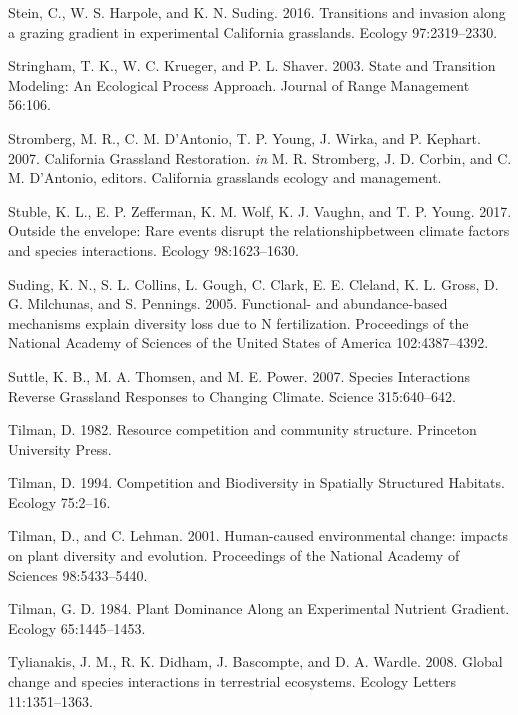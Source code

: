 \documentclass[twoside,12pt,final]{ucthesis-CA2012}
\begin{document}
\begin{ucmainmatter}
\leavevmode\hypertarget{ref-Stein2016}{}%
Stein, C., W. S. Harpole, and K. N. Suding. 2016. Transitions and invasion along a grazing gradient in experimental California grasslands. Ecology 97:2319--2330.

\leavevmode\hypertarget{ref-Stringham2003}{}%
Stringham, T. K., W. C. Krueger, and P. L. Shaver. 2003. State and Transition Modeling: An Ecological Process Approach. Journal of Range Management 56:106.

\leavevmode\hypertarget{ref-Stromberg2007}{}%
Stromberg, M. R., C. M. D'Antonio, T. P. Young, J. Wirka, and P. Kephart. 2007. California Grassland Restoration. \emph{in} M. R. Stromberg, J. D. Corbin, and C. M. D'Antonio, editors. California grasslands ecology and management.

\leavevmode\hypertarget{ref-Stuble2017}{}%
Stuble, K. L., E. P. Zefferman, K. M. Wolf, K. J. Vaughn, and T. P. Young. 2017. Outside the envelope: Rare events disrupt the relationshipbetween climate factors and species interactions. Ecology 98:1623--1630.

\leavevmode\hypertarget{ref-Suding2005}{}%
Suding, K. N., S. L. Collins, L. Gough, C. Clark, E. E. Cleland, K. L. Gross, D. G. Milchunas, and S. Pennings. 2005. Functional- and abundance-based mechanisms explain diversity loss due to N fertilization. Proceedings of the National Academy of Sciences of the United States of America 102:4387--4392.

\leavevmode\hypertarget{ref-Suttle2007}{}%
Suttle, K. B., M. A. Thomsen, and M. E. Power. 2007. Species Interactions Reverse Grassland Responses to Changing Climate. Science 315:640--642.

\leavevmode\hypertarget{ref-tilman1982resource}{}%
Tilman, D. 1982. Resource competition and community structure. Princeton University Press.

\leavevmode\hypertarget{ref-Tilman1994}{}%
Tilman, D. 1994. Competition and Biodiversity in Spatially Structured Habitats. Ecology 75:2--16.

\leavevmode\hypertarget{ref-Tilman2001}{}%
Tilman, D., and C. Lehman. 2001. Human-caused environmental change: impacts on plant diversity and evolution. Proceedings of the National Academy of Sciences 98:5433--5440.

\leavevmode\hypertarget{ref-Tilman1984}{}%
Tilman, G. D. 1984. Plant Dominance Along an Experimental Nutrient Gradient. Ecology 65:1445--1453.

\leavevmode\hypertarget{ref-Tylianakis2008}{}%
Tylianakis, J. M., R. K. Didham, J. Bascompte, and D. A. Wardle. 2008. Global change and species interactions in terrestrial ecosystems. Ecology Letters 11:1351--1363.


\end{ucmainmatter}
\end{document}
